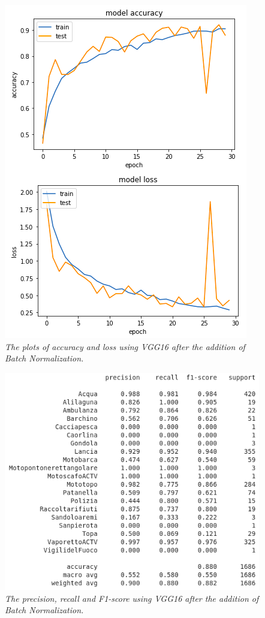 \documentclass[12pt,a4paper]{report}
\begin{document}
\begin{figure}[H]
\centering
\includegraphics[scale=0.4]{./immagini/vgg16/2_data_augmentation_-_30_epochs_no_stopping_-_dropout_0p5_-_classifier_batch_norm/plot_loss_accuracy.png}
\caption{\textit{The plots of accuracy and loss using VGG16 after the addition of Batch Normalization.}}
\end{figure}
\begin{figure}[H]
\centering
\includegraphics[scale=0.4]{./immagini/vgg16/2_data_augmentation_-_30_epochs_no_stopping_-_dropout_0p5_-_classifier_batch_norm/f1.png}
\caption{\textit{The precision, recall and F1-score using VGG16 after the addition of Batch Normalization.}}
\end{figure}
\end{document}
